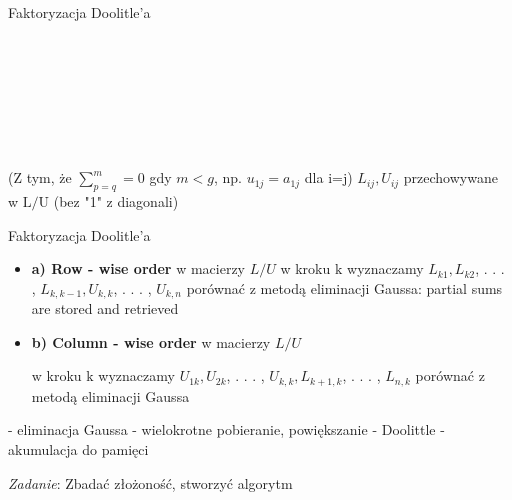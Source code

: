 \begin{frame}{Faktoryzacja Doolitle'a}
\begin{flushright}
\\
\\
\\
\\
\\
\\
\end{flushright}

(Z tym, że \scalebox{0.70} {$\displaystyle \sum_{p=q}^{m}=0$ } gdy $m < g$, np. $u_{1j}=a_{1j}$ dla i=j) \newline
$L_{ij}, U_{ij}$ przechowywane w $\mathrm{L}/\mathrm{U}$ (bez "1" $\mathrm{z}$ diagonali)
\end{frame}
\begin{frame}{Faktoryzacja Doolitle'a}
\begin{itemize}
\item \textbf{a) Row - wise order } w macierzy $L/U$
w kroku $\mathrm{k}$ wyznaczamy $L_{k1}, L_{k2}$, . . . , $L_{k,k-1}, U_{k,k}$, . . . , $U_{k,n}$ porównać z metodą eliminacji Gaussa: partial sums are stored and retrieved
\item \textbf{b) Column - wise order}  w macierzy $L/U$

$\mathrm{w}$ kroku $\mathrm{k}$ wyznaczamy $U_{1k}, U_{2k}$, . . . , $U_{k,k}, L_{k+1,k}$, . . . , $L_{n,k}$ porównać z metodą eliminacji Gaussa
\end{itemize}


- eliminacja Gaussa - wielokrotne pobieranie, powiększanie \newline - Doolittle - akumulacja do pamięci

\begin{flushright}
{\it Zadanie}: Zbadać złożoność, stworzyć algorytm
\end{flushright} 

\end{frame}
